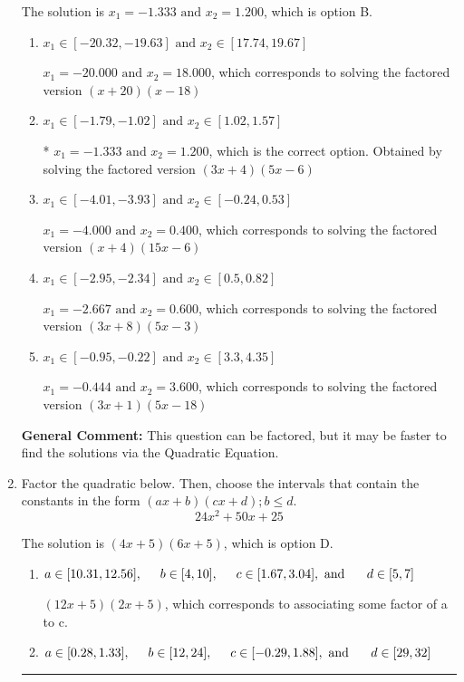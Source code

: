 \documentclass{extbook}[14pt]
\newcommand{\litem}[1]{\item #1

\rule{\textwidth}{0.4pt}}
\begin{document}
\begin{enumerate}
{The solution is \( x_1 = -1.333 \text{ and } x_2 = 1.200 \), which is option B.\begin{enumerate}[label=\Alph*.]
\item \( x_1 \in [-20.32, -19.63] \text{ and } x_2 \in [17.74, 19.67] \)

$x_1 = -20.000 \text{ and } x_2 = 18.000$, which corresponds to solving the factored version $(x + 20)(x -18)$
\item \( x_1 \in [-1.79, -1.02] \text{ and } x_2 \in [1.02, 1.57] \)

* $x_1 = -1.333 \text{ and } x_2 = 1.200$, which is the correct option. Obtained by solving the factored version $(3x + 4)(5x -6)$
\item \( x_1 \in [-4.01, -3.93] \text{ and } x_2 \in [-0.24, 0.53] \)

$x_1 = -4.000 \text{ and } x_2 = 0.400$, which corresponds to solving the factored version $(x + 4)(15x -6)$
\item \( x_1 \in [-2.95, -2.34] \text{ and } x_2 \in [0.5, 0.82] \)

$x_1 = -2.667 \text{ and } x_2 = 0.600$, which corresponds to solving the factored version $(3x + 8)(5x -3)$
\item \( x_1 \in [-0.95, -0.22] \text{ and } x_2 \in [3.3, 4.35] \)

$x_1 = -0.444 \text{ and } x_2 = 3.600$, which corresponds to solving the factored version $(3x + 1)(5x -18)$
\end{enumerate}

\textbf{General Comment:} This question can be factored, but it may be faster to find the solutions via the Quadratic Equation.
}
\litem{
Factor the quadratic below. Then, choose the intervals that contain the constants in the form $(ax+b)(cx+d); b \leq d.$
\[ 24x^{2} +50 x + 25 \]

The solution is \( (4x + 5)(6x + 5) \), which is option D.\begin{enumerate}[label=\Alph*.]
\item \( a \in [10.31, 12.56], \hspace*{5mm} b \in [4, 10], \hspace*{5mm} c \in [1.67, 3.04], \text{ and } \hspace*{5mm} d \in [5, 7] \)

 $(12x + 5)(2x + 5)$, which corresponds to associating some factor of a to c.
\item \( a \in [0.28, 1.33], \hspace*{5mm} b \in [12, 24], \hspace*{5mm} c \in [-0.29, 1.88], \text{ and } \hspace*{5mm} d \in [29, 32] \)


\end{enumerate}}
\end{enumerate}
\end{document}
